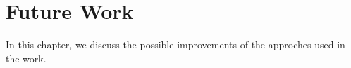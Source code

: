 \cleardoublepage

\chapter{Future Work}
\label{futureworkchapter}

In this chapter, we discuss the possible improvements of the approches used in the work.
